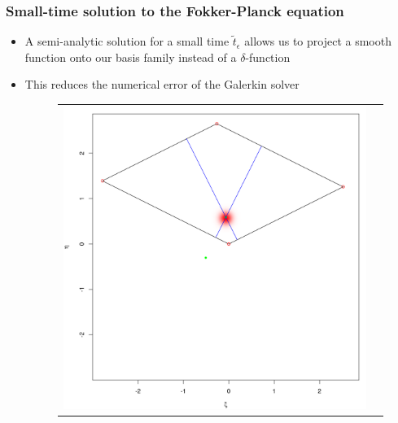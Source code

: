 \documentclass{beamer}
\begin{document}
\begin{frame}
  \frametitle{Small-time solution to the Fokker-Planck equation}
  \begin{itemize}
  \item A semi-analytic solution for a small time $\tilde{t}_\epsilon$ allows us to project a smooth function onto our basis family instead of a $\delta$-function
  \item This reduces the numerical error of the Galerkin solver
    \begin{figure}
      \centering
      \begin{tabular}{cc}
        \begin{minipage}{0.3\textwidth}
          \centering
          \includegraphics[width=1\linewidth]{../small-time-solution.png}
        \end{minipage}
        & \begin{minipage}{0.3\textwidth}
          \centering

\end{minipage}
\end{tabular}
\end{figure}
\end{itemize}
\end{frame}
\end{document}
